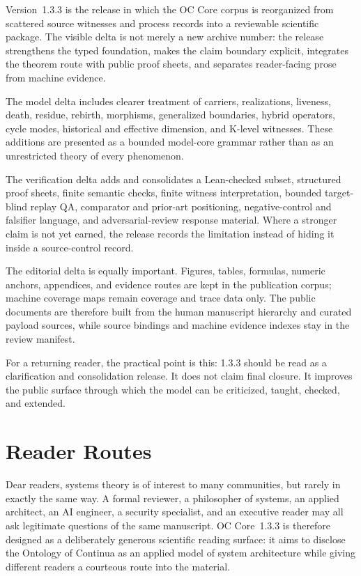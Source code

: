 Version~1.3.3 is the release in which the OC Core corpus is reorganized from
scattered source witnesses and process records into a reviewable scientific
package. The visible delta is not merely a new archive number: the release
strengthens the typed foundation, makes the claim boundary explicit, integrates
the theorem route with public proof sheets, and separates reader-facing prose
from machine evidence.

The model delta includes clearer treatment of carriers, realizations, liveness,
death, residue, rebirth, morphisms, generalized boundaries, hybrid operators,
cycle modes, historical and effective dimension, and K-level witnesses. These
additions are presented as a bounded model-core grammar rather than as an
unrestricted theory of every phenomenon.

The verification delta adds and consolidates a Lean-checked subset, structured
proof sheets, finite semantic checks, finite witness interpretation, bounded
target-blind replay QA, comparator and prior-art positioning, negative-control
and falsifier language, and adversarial-review response material. Where a
stronger claim is not yet earned, the release records the limitation instead of
hiding it inside a source-control record.

The editorial delta is equally important. Figures, tables, formulas, numeric
anchors, appendices, and evidence routes are kept in the publication corpus;
machine coverage maps remain coverage and trace data only. The public
documents are therefore built from the human manuscript hierarchy and curated
payload sources, while source bindings and machine evidence indexes stay in the
review manifest.

For a returning reader, the practical point is this: 1.3.3 should be read as a
clarification and consolidation release. It does not claim final closure. It
improves the public surface through which the model can be criticized, taught,
checked, and extended.

\clearpage
\section*{Reader Routes}
Dear readers, systems theory is of interest to many communities, but rarely in
exactly the same way. A formal reviewer, a philosopher of systems, an applied
architect, an AI engineer, a security specialist, and an executive reader may
all ask legitimate questions of the same manuscript. OC Core~1.3.3 is therefore
designed as a deliberately generous scientific reading surface: it aims to
disclose the Ontology of Continua as an applied model of system architecture
while giving different readers a courteous route into the material.

